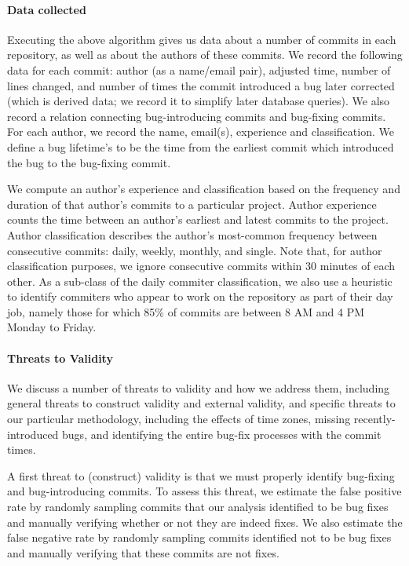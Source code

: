 \paragraph{Data collected}
Executing the above algorithm gives us data about a number of commits
in each repository, as well as about the authors of these commits.  We
record the following data for each commit: author (as a name/email
pair), adjusted time, number of lines changed, and number of times the
commit introduced a bug later corrected (which is derived data; we
record it to simplify later database queries). We also record a
relation connecting bug-introducing commits and bug-fixing
commits. For each author, we record the name, email(s), experience and
classification. We define a bug lifetime's to be the time from the
earliest commit which introduced the bug to the bug-fixing commit.

We compute an author's experience and classification based on the
frequency and duration of that author's commits to a particular
project. Author experience counts the time between an author's
earliest and latest commits to the project. Author classification
describes the author's most-common frequency between consecutive
commits: daily, weekly, monthly, and single. Note that, for author
classification purposes, we ignore consecutive commits within 30
minutes of each other. As a sub-class of the daily commiter
classification, we also use a heuristic to identify commiters who
appear to work on the repository as part of their day job, namely
those for which 85\% of commits are between 8 AM and 4 PM Monday to
Friday.

\paragraph{Threats to Validity}
We discuss a number of threats to validity and how we address them,
including general threats to construct validity and external validity,
and specific threats to our particular methodology, including the
effects of time zones, missing recently-introduced bugs, and
identifying the entire bug-fix processes with the commit times.

A first threat to (construct) validity is that we must properly
identify bug-fixing and bug-introducing commits. To assess this
threat, we estimate the false positive rate by randomly sampling
commits that our analysis identified to be bug fixes and manually
verifying whether or not they are indeed fixes.  We also estimate the
false negative rate by randomly sampling commits identified not to be
bug fixes and manually verifying that these commits are not fixes.

